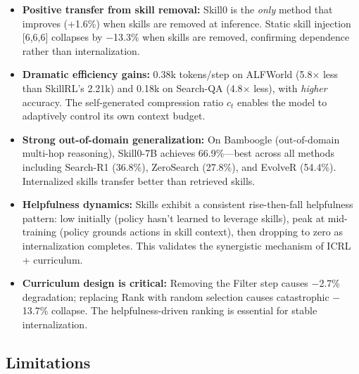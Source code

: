 \documentclass[11pt]{article}
\begin{document}
\begin{itemize}
    \item \textbf{Positive transfer from skill removal:} Skill0 is the \textit{only} method that improves (+1.6\%) when skills are removed at inference. Static skill injection [6,6,6] collapses by $-$13.3\% when skills are removed, confirming dependence rather than internalization.

    \item \textbf{Dramatic efficiency gains:} 0.38k tokens/step on ALFWorld (5.8$\times$ less than SkillRL's 2.21k) and 0.18k on Search-QA (4.8$\times$ less), with \textit{higher} accuracy. The self-generated compression ratio $c_t$ enables the model to adaptively control its own context budget.

    \item \textbf{Strong out-of-domain generalization:} On Bamboogle (out-of-domain multi-hop reasoning), Skill0-7B achieves 66.9\%---best across all methods including Search-R1 (36.8\%), ZeroSearch (27.8\%), and EvolveR (54.4\%). Internalized skills transfer better than retrieved skills.

    \item \textbf{Helpfulness dynamics:} Skills exhibit a consistent rise-then-fall helpfulness pattern: low initially (policy hasn't learned to leverage skills), peak at mid-training (policy grounds actions in skill context), then dropping to zero as internalization completes. This validates the synergistic mechanism of ICRL + curriculum.

    \item \textbf{Curriculum design is critical:} Removing the Filter step causes $-$2.7\% degradation; replacing Rank with random selection causes catastrophic $-$13.7\% collapse. The helpfulness-driven ranking is essential for stable internalization.
\end{itemize}

\subsection{Limitations}
\end{document}
